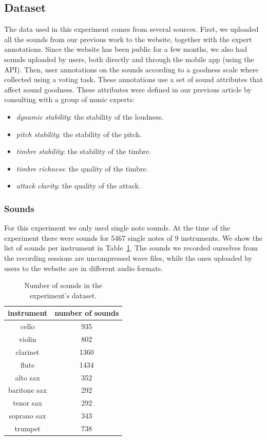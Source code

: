 \documentclass{article}
\begin{document}
\subsection{Dataset}
The data used in this experiment comes from several sources. First, we uploaded all the sounds from our previous work to the website, together with the expert annotations. Since the website has been public for a few months, we also had  sounds uploaded by users, both directly and through the mobile app (using the API). Then, user annotations on the sounds according to a goodness scale where collected using a voting task. These annotations use a set of sound attributes that affect sound goodness. These attributes were defined in our previous article \cite{01} by consulting with a group of music experts:   
\begin{itemize}
	\item{\textit{dynamic stability}: the stability of the loudness.}
	\item{\textit{pitch stability}: the stability of the pitch.}
	\item{\textit{timbre stability}: the stability of the timbre.}
	\item{\textit{timbre richness}: the quality of the timbre.}
	\item{\textit{attack clarity}: the quality of the attack.}
\end{itemize}

\subsubsection{Sounds}
For this experiment we only used single note sounds. At the time of the experiment there were sounds for 5467 single notes of 9 instruments. We show the list of sounds per instrument in Table~\ref{sounds}. The sounds we recorded ourselves from the recording sessions are uncompressed wave files, while the ones uploaded by users to the website are in different audio formats.  

\begin{table}[ht]
\centering
\begin{tabular}{cc}
\hline
instrument   & number of sounds \\ \hline
cello        & 935              \\
violin       & 802              \\
clarinet     & 1360             \\
flute        & 1434             \\
alto sax     & 352              \\
baritone sax & 292              \\
tenor sax    & 292              \\
soprano sax  & 343              \\
trumpet      & 738              \\ \hline
\end{tabular}
\caption{Number of sounds in the experiment's dataset.}
\label{sounds}
\end{table}
\end{document}
